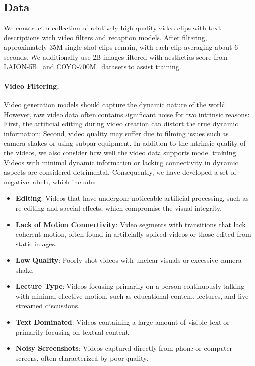 \subsection{Data}


We construct a collection of relatively high-quality video clips with text descriptions with video filters and recaption models. %
After filtering, approximately 35M single-shot clips remain, with each clip averaging about 6 seconds. We additionally use 2B images filtered with aesthetics score from LAION-5B~\citep{schuhmann2022laion} and COYO-700M~\citep{kakaobrain2022coyo-700m} datasets to assist training.



\paragraph{Video Filtering.}

Video generation models should capture the dynamic nature of the world. However, raw video data often contains significant noise for two intrinsic reasons: First, the artificial editing during video creation can distort the true dynamic information; Second, video quality may suffer due to filming issues such as camera shakes or using subpar equipment. In addition to the intrinsic quality of the videos, we also consider how well the video data supports model training. 
Videos with minimal dynamic information or lacking connectivity in dynamic aspects are considered detrimental. 
Consequently, we have developed a set of negative labels, which include:

\begin{itemize}
    \item \textbf{Editing}: Videos that have undergone noticeable artificial processing, such as re-editing and special effects, which compromise the visual integrity.
    \item \textbf{Lack of Motion Connectivity}: Video segments with transitions that lack coherent motion, often found in artificially spliced videos or those edited from static images.
    \item \textbf{Low Quality}: Poorly shot videos with unclear visuals or excessive camera shake.
    \item \textbf{Lecture Type}: Videos focusing primarily on a person continuously talking with minimal effective motion, such as educational content, lectures, and live-streamed discussions.
    \item \textbf{Text Dominated}: Videos containing a large amount of visible text or primarily focusing on textual content.
    \item \textbf{Noisy Screenshots}: Videos captured directly from phone or computer screens, often characterized by poor quality.
\end{itemize}

